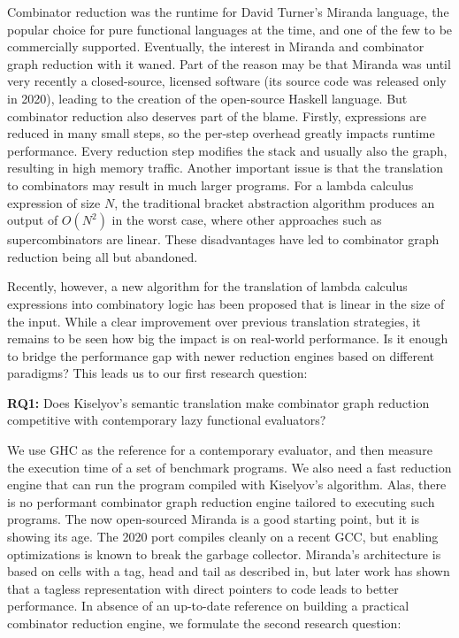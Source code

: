 \documentclass[conference]{IEEEtran}
\begin{document}
Combinator reduction was the runtime for David Turner's Miranda language\cite{turner_miranda_1985}, the popular choice for pure functional languages at the time, and one of the few to be commercially supported.
Eventually, the interest in Miranda and combinator graph reduction with it waned.
Part of the reason may be that Miranda was until very recently a closed-source, licensed software (its source code was released only in 2020\cite{noauthor_open_2021}), leading to the creation of the open-source Haskell language.
But combinator reduction also deserves part of the blame.
Firstly, expressions are reduced in many small steps, so the per-step overhead greatly impacts runtime performance.
Every reduction step modifies the stack and usually also the graph, resulting in high memory traffic.
Another important issue is that the translation to combinators may result in much larger programs.
For a lambda calculus expression of size $N$, the traditional bracket abstraction algorithm produces an output of $O(N^2)$ in the worst case, where other approaches such as supercombinators are linear\cite{spj_impl}.
These disadvantages have led to combinator graph reduction being all but abandoned.

Recently, however, a new algorithm for the translation of lambda calculus expressions into combinatory logic has been proposed that is linear in the size of the input\cite{kiselyov_lambda_2018}.
While a clear improvement over previous translation strategies, it remains to be seen how big the impact is on real-world performance.
Is it enough to bridge the performance gap with newer reduction engines based on different paradigms?
This leads us to our first research question:

\textbf{RQ1:} Does Kiselyov's semantic translation make combinator graph reduction competitive with contemporary lazy functional evaluators?

We use GHC as the reference for a contemporary evaluator, and then measure the execution time of a set of benchmark programs.
We also need a fast reduction engine that can run the program compiled with Kiselyov's algorithm.
Alas, there is no performant combinator graph reduction engine tailored to executing such programs.
The now open-sourced Miranda is a good starting point, but it is showing its age.
The 2020 port compiles cleanly on a recent GCC, but enabling optimizations is known to break the garbage collector.
Miranda's architecture is based on cells with a tag, head and tail as described in\cite{turner_new_1979}, but later work has shown that a tagless representation with direct pointers to code leads to better performance\cite{koopman_fresh_1989}.
In absence of an up-to-date reference on building a practical combinator reduction engine, we formulate the second research question:
\end{document}
